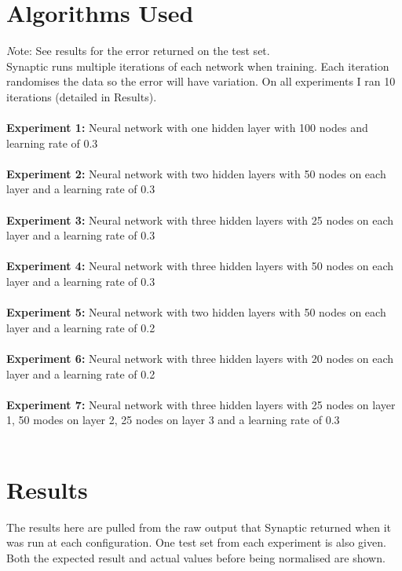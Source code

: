 \documentclass[11pt]{article}
\begin{document}
\begin{page}
\section{Algorithms Used}
\emph Note: See results for the error returned on the test set.\\
 
\noindent Synaptic runs multiple iterations of each network when training. Each iteration randomises the data so the error will have variation. On all experiments I ran 10 iterations (detailed in Results).\\
\\
\noindent \textbf{Experiment 1:} Neural network with one hidden layer with 100 nodes and learning rate of 0.3\\\\
\textbf{Experiment 2:} Neural network with two hidden layers with 50 nodes on each layer and a learning rate of 0.3\\\\
\textbf{Experiment 3:} Neural network with three hidden layers with 25 nodes on each layer and a learning rate of 0.3\\\\
\textbf{Experiment 4:} Neural network with three hidden layers with 50 nodes on each layer and a learning rate of 0.3\\\\
\textbf{Experiment 5:} Neural network with two hidden layers with 50 nodes on each layer and a learning rate of 0.2\\\\
\textbf{Experiment 6:} Neural network with three hidden layers with 20 nodes on each layer and a learning rate of 0.2\\\\
\textbf{Experiment 7:} Neural network with three hidden layers with 25 nodes on layer 1, 50 modes on layer 2, 25 nodes on layer 3 and a learning rate of 0.3\\\\

\section{Results}
The results here are pulled from the raw output that Synaptic returned when it was run at each configuration. One test set from each experiment is also given. Both the expected result and actual values before being normalised are shown.\\


\end{page}
\end{document}
